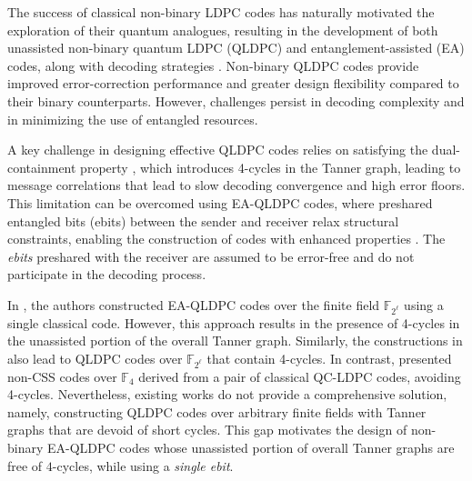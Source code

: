 \documentclass[conference]{IEEEtran}
\begin{document}
The success of classical non-binary LDPC codes has naturally motivated the exploration of their quantum analogues, resulting in the development of both   unassisted non-binary quantum LDPC (QLDPC) and entanglement-assisted (EA) codes, along with decoding strategies \cite{xie2016reliable, shao2018entanglement, andriyanova2012quantum, hwang2013decoding}. Non-binary QLDPC codes provide improved error-correction performance and greater design flexibility compared to their binary counterparts. However, challenges persist in decoding complexity and in minimizing the use of entangled resources.

A key challenge in designing effective QLDPC codes relies on satisfying the dual-containment property \cite{calderbank1998quantum,ketkar2006nonbinary}, which  introduces 4-cycles in the Tanner graph, leading to message correlations that lead to slow decoding convergence and high error floors. This limitation can be overcomed using EA-QLDPC codes, where preshared entangled bits  (ebits) between the sender and receiver relax structural constraints, enabling the construction of codes with enhanced properties \cite{brun2006correcting, galindo2019entanglement}. The \emph{ebits} preshared with the receiver are assumed to be error-free and do not participate in the decoding process.

In \cite{shao2018entanglement}, the authors constructed EA-QLDPC codes over the finite field $\mathbb{F}_{2^{\ell}}$ using a single classical code. However, this approach results in the presence of 4-cycles in the unassisted portion of the overall Tanner graph. Similarly, the constructions in \cite{andriyanova2012quantum, Decoder} also lead to  QLDPC codes over $\mathbb{F}_{2^{\ell}}$ that contain 4-cycles. In contrast, \cite{xie2016reliable} presented non-CSS codes over $\mathbb{F}_{4}$ derived from a pair of classical QC-LDPC codes, avoiding 4-cycles. Nevertheless, existing works do not provide a comprehensive solution, namely, constructing QLDPC codes over arbitrary finite fields with Tanner graphs that are devoid of short cycles. This gap motivates the design of non-binary EA-QLDPC codes whose unassisted portion of overall Tanner graphs are free of $4$-cycles, while using a \emph{single ebit}.
 
\end{document}
